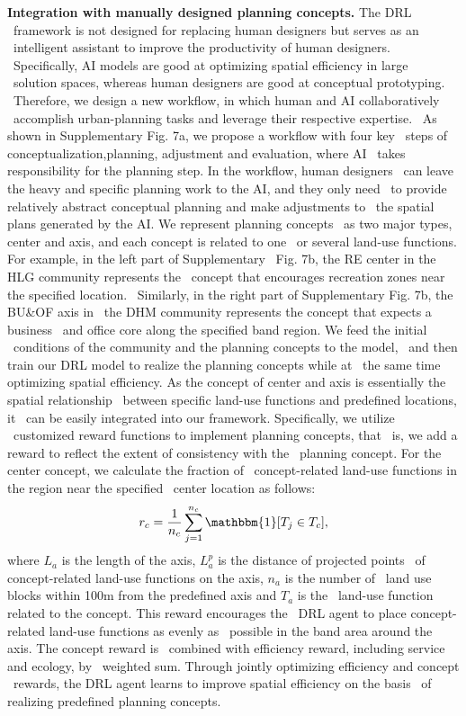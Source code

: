\textbf{Integration with manually designed planning concepts.} The DRL \
framework is not designed for replacing human designers but serves as an \
intelligent assistant to improve the productivity of human designers. \
Specifically, AI models are good at optimizing spatial efficiency in large \
solution spaces, whereas human designers are good at conceptual prototyping. \
Therefore, we design a new workflow, in which human and AI collaboratively \
accomplish urban-planning tasks and leverage their respective expertise. \
As shown in Supplementary Fig. 7a, we propose a workflow with four key \
steps of conceptualization,planning, adjustment and evaluation, where AI \
takes responsibility for the planning step. In the workflow, human designers \
can leave the heavy and specific planning work to the AI, and they only need \
to provide relatively abstract conceptual planning and make adjustments to \
the spatial plans generated by the AI. We represent planning concepts \
as two major types, center and axis, and each concept is related to one \
or several land-use functions. For example, in the left part of Supplementary \
Fig. 7b, the RE center in the HLG community represents the \
concept that encourages recreation zones near the specified location. \
Similarly, in the right part of Supplementary Fig. 7b, the BU\&OF axis in \
the DHM community represents the concept that expects a business \
and office core along the specified band region. We feed the initial \
conditions of the community and the planning concepts to the model, \
and then train our DRL model to realize the planning concepts while at \
the same time optimizing spatial efficiency.
As the concept of center and axis is essentially the spatial relationship \
between specific land-use functions and predefined locations, it \
can be easily integrated into our framework. Specifically, we utilize \
customized reward functions to implement planning concepts, that \
is, we add a reward to reflect the extent of consistency with the \
planning concept. For the center concept, we calculate the fraction of \
concept-related land-use functions in the region near the specified \
center location as follows:
\begin{equation}
    r_c = \frac{1}{n_c}\sum_{j=1}^{n_c}\mathbbm{1}[T_j\in T_c],\label{concept-related-land-use-functions}
\end{equation}
where $L_a$ is the length of the axis, $L^p_a$ is the distance of projected points \
of concept-related land-use functions on the axis, $n_a$ is the number of \
land use blocks within 100m from the predefined axis and $T_a$ is the \
land-use function related to the concept. This reward encourages the \
DRL agent to place concept-related land-use functions as evenly as \
possible in the band area around the axis. The concept reward is \
combined with efficiency reward, including service and ecology, by \
weighted sum. Through jointly optimizing efficiency and concept \
rewards, the DRL agent learns to improve spatial efficiency on the basis \
of realizing predefined planning concepts.